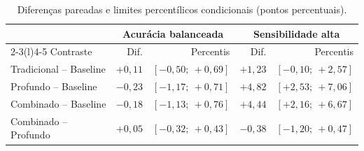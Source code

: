 \begin{table}[H]\centering\small
\caption{Diferenças pareadas e limites percentílicos condicionais (pontos percentuais).}\label{tab:contrastes_final}
\begin{tabular}{@{}lrrrr@{}}\toprule
& \multicolumn{2}{c}{Acurácia balanceada} & \multicolumn{2}{c}{Sensibilidade alta}\\
\cmidrule(lr){2-3}\cmidrule(l){4-5}
Contraste & Dif. & Percentis & Dif. & Percentis \\\midrule
Tradicional -- Baseline & $+0{,}11$ & $[-0{,}50;\ +0{,}69]$ & $+1{,}23$ & $[-0{,}10;\ +2{,}57]$ \\
Profundo -- Baseline & $-0{,}23$ & $[-1{,}17;\ +0{,}71]$ & $+4{,}82$ & $[+2{,}53;\ +7{,}06]$ \\
Combinado -- Baseline & $-0{,}18$ & $[-1{,}13;\ +0{,}76]$ & $+4{,}44$ & $[+2{,}16;\ +6{,}67]$ \\
Combinado -- Profundo & $+0{,}05$ & $[-0{,}32;\ +0{,}43]$ & $-0{,}38$ & $[-1{,}20;\ +0{,}47]$ \\\bottomrule
\end{tabular}
\end{table}

